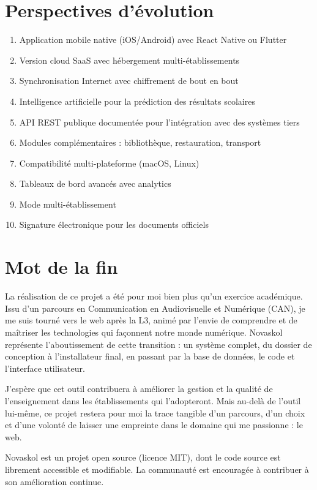 \documentclass[12pt,a4paper,twoside]{report}
\begin{document}
\section*{Perspectives d'évolution}

\begin{enumerate}
    \item Application mobile native (iOS/Android) avec React Native ou Flutter
    \item Version cloud SaaS avec hébergement multi-établissements
    \item Synchronisation Internet avec chiffrement de bout en bout
    \item Intelligence artificielle pour la prédiction des résultats scolaires
    \item API REST publique documentée pour l'intégration avec des systèmes tiers
    \item Modules complémentaires : bibliothèque, restauration, transport
    \item Compatibilité multi-plateforme (macOS, Linux)
    \item Tableaux de bord avancés avec analytics
    \item Mode multi-établissement
    \item Signature électronique pour les documents officiels
\end{enumerate}

\section*{Mot de la fin}

La réalisation de ce projet a été pour moi bien plus qu'un exercice académique. Issu d'un parcours en Communication en Audiovisuelle et Numérique (CAN), je me suis tourné vers le web après la L3, animé par l'envie de comprendre et de maîtriser les technologies qui façonnent notre monde numérique. Novaskol représente l'aboutissement de cette transition : un système complet, du dossier de conception à l'installateur final, en passant par la base de données, le code et l'interface utilisateur.

J'espère que cet outil contribuera à améliorer la gestion et la qualité de l'enseignement dans les établissements qui l'adopteront. Mais au-delà de l'outil lui-même, ce projet restera pour moi la trace tangible d'un parcours, d'un choix et d'une volonté de laisser une empreinte dans le domaine qui me passionne : le web.

Novaskol est un projet open source (licence MIT), dont le code source est librement accessible et modifiable. La communauté est encouragée à contribuer à son amélioration continue.
\end{document}
